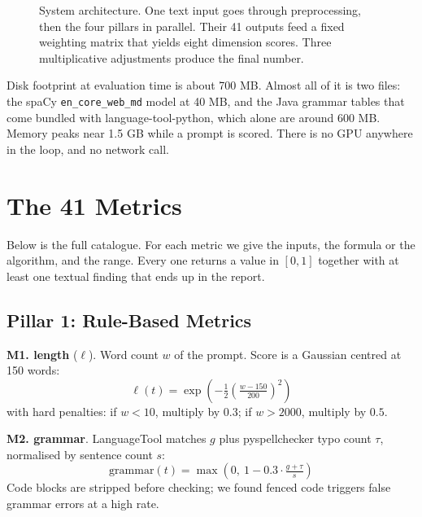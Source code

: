 \documentclass[conference]{IEEEtran}
\begin{document}
\begin{figure}[t]
{%
}
\caption{System architecture. One text input goes through preprocessing, then the four pillars in parallel. Their 41 outputs feed a fixed weighting matrix that yields eight dimension scores. Three multiplicative adjustments produce the final number.}
\label{fig:arch}
\end{figure}

Disk footprint at evaluation time is about 700 MB. Almost all of it is two files: the spaCy \texttt{en\_core\_web\_md} model at 40 MB, and the Java grammar tables that come bundled with language-tool-python, which alone are around 600 MB. Memory peaks near 1.5 GB while a prompt is scored. There is no GPU anywhere in the loop, and no network call.

\section{The 41 Metrics}

Below is the full catalogue. For each metric we give the inputs, the formula or the algorithm, and the range. Every one returns a value in $[0, 1]$ together with at least one textual finding that ends up in the report.

\subsection{Pillar 1: Rule-Based Metrics}

\textbf{M1. length} ($\ell$). Word count $w$ of the prompt. Score is a Gaussian centred at 150 words:
\[ \ell(t) = \exp\!\left(-\tfrac{1}{2}\left(\tfrac{w - 150}{200}\right)^2\right) \]
with hard penalties: if $w < 10$, multiply by $0.3$; if $w > 2000$, multiply by $0.5$.

\textbf{M2. grammar}. LanguageTool \cite{languagetool} matches $g$ plus pyspellchecker typo count $\tau$, normalised by sentence count $s$:
\[ \mathrm{grammar}(t) = \max\!\left(0,\ 1 - 0.3 \cdot \tfrac{g + \tau}{s}\right) \]
Code blocks are stripped before checking; we found fenced code triggers false grammar errors at a high rate.
\end{document}
